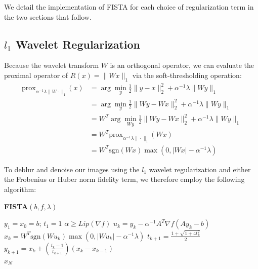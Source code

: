 \documentclass[10pt,a4paper]{article}
\newcommand{\prox}{\mathrm{prox}}
\begin{document}
	We detail the implementation of FISTA for each choice of regularization term in the two sections that follow.
	
	\subsection{$l_1$ Wavelet Regularization}
	
	Because the wavelet transform $W$ is an orthogonal operator, we can evaluate the proximal operator of $R(x) = \|Wx\|_1$ via the soft-thresholding operation:
	\begin{equation}
	\begin{aligned}
	\prox_{\alpha^{-1}\lambda \| W \cdot \|_1}(x) &= \arg\min_y \frac{1}{2} \| y-x \|_2^2 + \alpha^{-1}\lambda \| Wy \|_1 \\
	&= \arg\min_y \frac{1}{2} \| Wy - Wx \|_2^2 + \alpha^{-1}\lambda \|Wy \|_1 \\
	&= W^T \arg\min_{Wy} \frac{1}{2} \| Wy - Wx \|_2^2 + \alpha^{-1}\lambda \|Wy \|_1 \\
	&= W^T \prox_{\alpha^{-1}\lambda \|\cdot\|_1}(Wx) \\
	&= W^T \text{sgn}(Wx) \max(0, |Wx|-\alpha^{-1}\lambda)
	\end{aligned}
	\end{equation}
	
	\newpage
	To deblur and denoise our images using the $l_1$ wavelet regularization and either the Frobenius or Huber norm fidelity term, we therefore employ the following algorithm:
	
	\begin{center}
		\begin{minipage}[T]{0.5\textwidth}
			\begin{framed}
				\textbf{FISTA$(b,f,\lambda)$}
				\begin{algorithmic}
					\State $y_1 = x_0 = b; \, t_1 = 1$
					\State $\alpha \geq Lip(\nabla f)$
					\State $u_k = y_k - \alpha^{-1} A^T \nabla f(Ay_k-b)$ \vspace{1ex}
					\State $x_k = W^T\text{sgn}(Wu_k)\max(0,|Wu_k|-\alpha^{-1}\lambda)$ \vspace{1ex}
					\State $t_{k+1} = \frac{1+\sqrt{1+4t_k^2}}{2}$
					\State $y_{k+1} = x_k + \left(\frac{t_k-1}{t_{k+1}}\right) (x_k - x_{k-1})$
					\EndFor\\
					\Return $x_N$
				\end{algorithmic}
			\end{framed}
		\end{minipage}
	\end{center}
	
\end{document}
